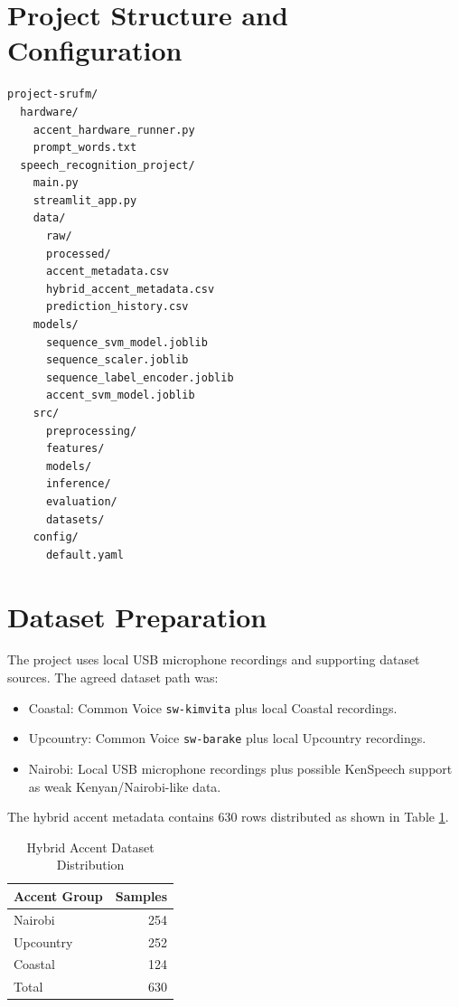 \documentclass[12pt,a4paper]{report}
\begin{document}
\section{Project Structure and Configuration}
\begin{verbatim}
project-srufm/
  hardware/
    accent_hardware_runner.py
    prompt_words.txt
  speech_recognition_project/
    main.py
    streamlit_app.py
    data/
      raw/
      processed/
      accent_metadata.csv
      hybrid_accent_metadata.csv
      prediction_history.csv
    models/
      sequence_svm_model.joblib
      sequence_scaler.joblib
      sequence_label_encoder.joblib
      accent_svm_model.joblib
    src/
      preprocessing/
      features/
      models/
      inference/
      evaluation/
      datasets/
    config/
      default.yaml
\end{verbatim}

\section{Dataset Preparation}
The project uses local USB microphone recordings and supporting dataset sources. The agreed dataset path was:
\begin{itemize}
    \item Coastal: Common Voice \texttt{sw-kimvita} plus local Coastal recordings.
    \item Upcountry: Common Voice \texttt{sw-barake} plus local Upcountry recordings.
    \item Nairobi: Local USB microphone recordings plus possible KenSpeech support as weak Kenyan/Nairobi-like data.
\end{itemize}

The hybrid accent metadata contains 630 rows distributed as shown in Table \ref{tab:accentdistribution}.

\begin{table}[H]
\centering
\caption{Hybrid Accent Dataset Distribution}
\label{tab:accentdistribution}
\begin{tabular}{lr}
\toprule
\textbf{Accent Group} & \textbf{Samples}\\
\midrule
Nairobi & 254\\
Upcountry & 252\\
Coastal & 124\\
\midrule
Total & 630\\
\bottomrule
\end{tabular}
\end{table}
\end{document}
